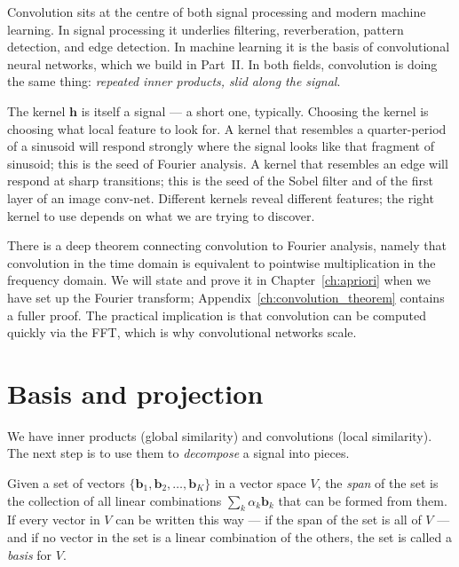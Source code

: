 
Convolution sits at the centre of both signal processing and modern
machine learning.  In signal processing it underlies filtering,
reverberation, pattern detection, and edge detection.  In machine
learning it is the basis of convolutional neural networks, which we
build in Part~\textsc{II}.  In both fields, convolution is doing the
same thing: \emph{repeated inner products, slid along the signal}.

The kernel $\mathbf{h}$ is itself a signal --- a short one, typically.
Choosing the kernel is choosing what local feature to look for.  A
kernel that resembles a quarter-period of a sinusoid will respond
strongly where the signal looks like that fragment of sinusoid; this is
the seed of Fourier analysis.  A kernel that resembles an edge will
respond at sharp transitions; this is the seed of the Sobel filter and
of the first layer of an image conv-net.  Different kernels reveal
different features; the right kernel to use depends on what we are
trying to discover.

There is a deep theorem connecting convolution to Fourier analysis,
namely that convolution in the time domain is equivalent to pointwise
multiplication in the frequency domain.  We will state and prove it in
Chapter~\ref{ch:apriori} when we have set up the Fourier transform;
Appendix~\ref{ch:convolution_theorem} contains a fuller proof.  The
practical implication is that convolution can be computed quickly via
the FFT, which is why convolutional networks scale.

\section{Basis and projection}

We have inner products (global similarity) and convolutions (local
similarity).  The next step is to use them to \emph{decompose} a signal
into pieces.

Given a set of vectors $\{\mathbf{b}_1, \mathbf{b}_2, \ldots,
\mathbf{b}_K\}$ in a vector space $V$, the \emph{span} of the set is the
collection of all linear combinations
\(
\sum_k \alpha_k \mathbf{b}_k
\)
that can be formed from them.  If every vector in $V$ can be written
this way --- if the span of the set is all of $V$ --- and if no vector
in the set is a linear combination of the others, the set is called a
\emph{basis} for $V$.

